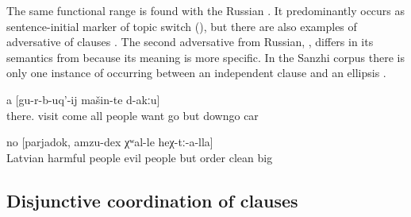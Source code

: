 The same functional range is found with the Russian   . It predominantly occurs as sentence-initial marker of topic switch (), but there are also examples of adversative  of clauses . The second adversative  from Russian,  , differs in its semantics from  because its meaning is more specific. In the Sanzhi corpus there is only one instance of  occurring between an independent clause and an ellipsis .
%
\begin{exe}
	\ex	\label{ex:‎There all the people who came want to leave, but there are no cars to leave}
	\gll	[hextːu-b	šːatːir	sa-b-ač'-ib-te	li<b>il=ra	χalq'	b-ikː-ul	ca-b	gu-r-b-uq'-aˁnaj]		a	[gu-r-b-uq'-ij	mašin-te	d-akːu]\\
		there.	visit	come 	all	people	want		go	but	downgo	car	\\
	\glt	{}

	\ex	\label{ex:‎‎‎The Latvian people were harmful, they were bad people, but order, cleanness is great among them}
	\gll	[latiši	wredni	χalq'=de,	wahi	χalq'=de]	no	[parjadok,	amzu-dex	χʷal-le	heχ-tː-a-lla]\\
		Latvian	harmful	people	evil	people	but	order	clean	big	\\
	\glt	{}
\end{exe}



\subsection{Disjunctive coordination of clauses}
\label{ssec:Disjunctive coordination of clauses}

